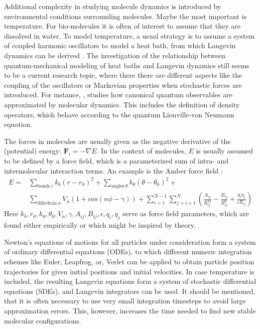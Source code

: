 Additional complexity in studying molecule dynamics is introduced by environmental conditions surrounding molecules. Maybe the most important is temperature. For bio-molecules it is often of interest to assume that they are dissolved in water. To model temperature, a usual strategy is to assume a system of coupled harmonic oscillators to model a heat bath, from which Langevin dynamics can be derived \citep{ford1965statistical, zwanzig1973nonlinear}. The investigation of the relationship between quantum-mechanical modeling of heat baths and Langevin dynamics still seems to be a current research topic, where there there are different aspects like the coupling of the oscillators or Markovian properties when stochastic forces are introduced. For instance, \citet{hoel2019classical}, studies how canonical quantum observables are approximated by molecular dynamics. This includes the definition of density operators, which behave according to the quantum Liouville-von Neumann equation. 

The forces in molecules are usually given as the negative derivative of the (potential) energy: $\mathbf{F}_i=- \nabla E$. In the context of molecules, $E$ is usually assumed to be defined by a force field, which is a parameterized sum of intra- and intermolecular interaction terms. An example is the Amber force field \citep{Ponder2003,Case2024}:
\begin{align}
E=&\sum_{\text{bonds} \ r} k_b (r-r_0)^2+\sum_{\text{angles} \ \theta} k_{\theta} (\theta-\theta_0)^2+\\ \nonumber &\sum_{\text{dihedrals} \ \phi} V_n (1+cos(n \phi - \gamma))+\sum_{i=1}^{N-1} \sum_{j=i+1}^{N} \left( \frac{A_{ij}}{R_{ij}^{12}}-\frac{B_{ij}}{R_{ij}^6}+\frac{q_i q_j}{\epsilon R_{ij}}\right)
\end{align}
Here $k_b, r_0, k_{\theta}, \theta_0, V_n, \gamma, A_{ij}, B_{ij}, \epsilon, q_i, q_j$ serve as force field parameters, which are found either empirically or which might be inspired by theory.

Newton's equations of motions for all particles under consideration form a system of ordinary differential equations (ODEs), to which different numeric integration schemes like Euler, Leapfrog, or, Verlet can be applied to obtain particle position trajectories for given initial positions and initial velocities. In case temperature is included, the resulting Langevin equations form a system of stochastic differential equations (SDEs), and Langevin integrators can be used. It should be mentioned, that it is often necessary to use very small integration timesteps to avoid large approximation errors. This, however, increases the time needed to find new stable molecular configurations.

